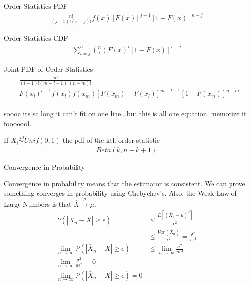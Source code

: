 \documentclass[avery5388,grid,frame]{flashcards}
\begin{document}
\begin{flashcard}[Equation]{Order Statistics PDF}
\bigskip\bigskip\bigskip
{\begin{align*}
\frac{n!}{(j-1)!(n-j)!}f(x)[F(x)]^{j-1}[1-F(x)]^{n-j}
\end{align*}}
\end{flashcard}
\begin{flashcard}[Equation]{Order Statistics CDF}
\bigskip\bigskip\bigskip
{\begin{align*}
\sum_{i=j}^n{n\choose i}F(x)^i[1-F(x)]^{n-i}
\end{align*}}
\end{flashcard}
\begin{flashcard}[Equation]{Joint PDF of Order Statistics}
\bigskip\bigskip\bigskip
{\begin{align*}
&\frac{n!}{(l-1)!(m-l-1)!(n-m)!}\\
&F(x_l)^{l-1}f(x_l)f(x_m)[F(x_m)-F(x_l)]^{m-l-1}[1-F(x_m)]^{n-m}
\end{align*}}
\bigskip\\
soooo its so long it can't fit on one line...but this is all one equation. memorize it fooooool.
\end{flashcard}
\begin{flashcard}{If $X_i\overset{iid}{\sim}Unif(0,1)$ the pdf of the kth order statistic}
\bigskip\bigskip\bigskip
{\begin{align*}
Beta(k,n-k+1)
\end{align*}}
\end{flashcard}
\begin{flashcard}[Proof]{Convergence in Probability}
\bigskip
\begin{center}
Convergence in probability means that the estimator is consistent. We can prove something converges in probability using Chebychev's. Also, the Weak Law of Large Numbers is that $\bar{X}\overset{p}{\rightarrow}\mu$.
{\begin{align*}
P(|\bar{X}_n-X|\geq \epsilon)&\leq\frac{E[(\bar{X}_n-\mu)^2]}{\epsilon^2}\\
&\leq\frac{Var(\bar{X}_n)}{\epsilon^2}=\frac{\sigma^2}{n\epsilon^2}\\
\lim_{n\rightarrow\infty}P(|\bar{X}_n-X|\geq \epsilon)&\leq\lim_{n\rightarrow\infty}\frac{\sigma^2}{n\epsilon^2}\\
\lim_{n\rightarrow\infty}\frac{\sigma^2}{n\epsilon^2}=0\\
\lim_{n\rightarrow\infty}P(|\bar{X}_n-X|\geq \epsilon)=0
\end{align*}}
\end{center}
\end{flashcard}
\end{document}
